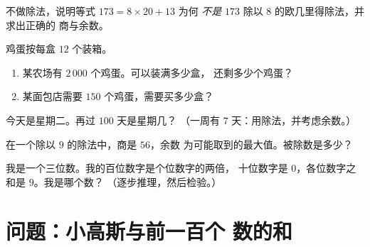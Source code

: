\begin{exercise}[$\star$]\label{exo:g6:wholes:8}
不做除法，说明等式 $173 = 8 \times 20 + 13$ 为何
\emph{不是} $173$ 除以 $8$ 的欧几里得除法，并求出正确的
商与余数。
\end{exercise}

\begin{exercise}[$\star\star$]\label{exo:g6:wholes:9}
鸡蛋按每盒 $12$ 个装箱。
\begin{enumerate}
  \item 某农场有 $2\,000$ 个鸡蛋。可以装满多少盒，
        还剩多少个鸡蛋？
  \item 某面包店需要 $150$ 个鸡蛋，需要买多少盒？
\end{enumerate}
\end{exercise}

\begin{exercise}[$\star\star$]\label{exo:g6:wholes:10}
今天是星期二。再过 $100$ 天是星期几？
（一周有 $7$ 天：用除法，并考虑余数。）
\end{exercise}

\begin{exercise}[$\star\star$]\label{exo:g6:wholes:11}
在一个除以 $9$ 的除法中，商是 $56$，余数
为可能取到的最大值。被除数是多少？
\end{exercise}

\begin{exercise}[$\star\star\star$]\label{exo:g6:wholes:12}
我是一个三位数。我的百位数字是个位数字的两倍，
十位数字是 $0$，各位数字之和是 $9$。我是哪个数？
（逐步推理，然后检验。）
\end{exercise}

\section{问题：小高斯与前一百个
数的和}

